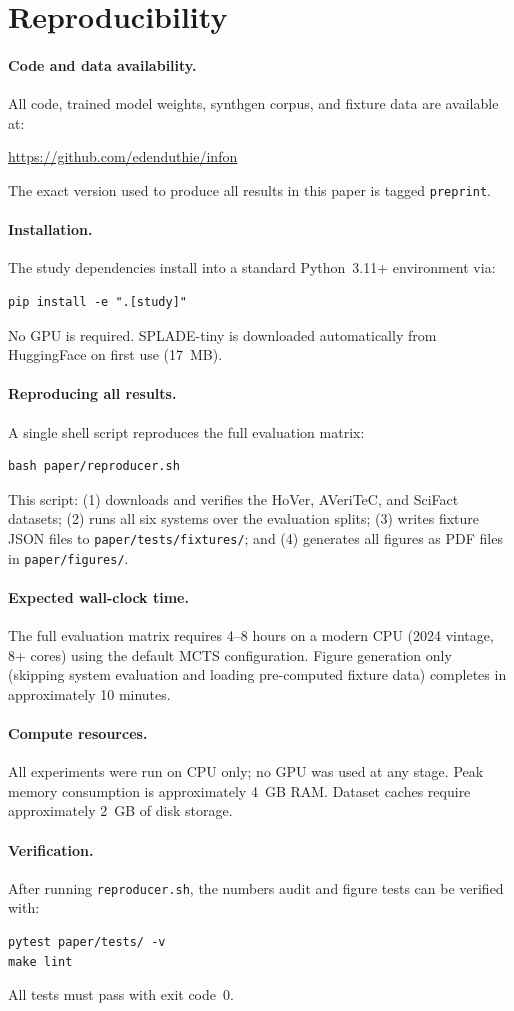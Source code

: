 \section{Reproducibility}
\label{sec:reproducibility}

\paragraph{Code and data availability.}
All code, trained model weights, synthgen corpus, and fixture data are
available at:
\begin{center}
  \url{https://github.com/edenduthie/infon}
\end{center}
The exact version used to produce all results in this paper is tagged
\texttt{preprint}.

\paragraph{Installation.}
The study dependencies install into a standard Python~3.11+ environment
via:
\begin{verbatim}
pip install -e ".[study]"
\end{verbatim}
No GPU is required.  SPLADE-tiny is downloaded automatically from
HuggingFace on first use (17~MB).

\paragraph{Reproducing all results.}
A single shell script reproduces the full evaluation matrix:
\begin{verbatim}
bash paper/reproducer.sh
\end{verbatim}
This script: (1) downloads and verifies the HoVer, AVeriTeC, and SciFact
datasets; (2) runs all six systems over the evaluation splits; (3) writes
fixture JSON files to \texttt{paper/tests/fixtures/}; and (4) generates
all figures as PDF files in \texttt{paper/figures/}.

\paragraph{Expected wall-clock time.}
The full evaluation matrix requires 4--8 hours on a modern CPU (2024
vintage, 8+ cores) using the default MCTS configuration.  Figure
generation only (skipping system evaluation and loading pre-computed
fixture data) completes in approximately 10 minutes.

\paragraph{Compute resources.}
All experiments were run on CPU only; no GPU was used at any stage.  Peak
memory consumption is approximately 4~GB RAM.  Dataset caches require
approximately 2~GB of disk storage.

\paragraph{Verification.}
After running \texttt{reproducer.sh}, the numbers audit and figure tests can
be verified with:
\begin{verbatim}
pytest paper/tests/ -v
make lint
\end{verbatim}
All tests must pass with exit code~0.
